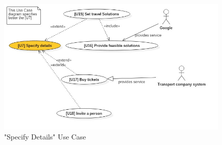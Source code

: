 	\begin{figure}[H]	
	\centerline{\includegraphics[width=\paperwidth~]{Images/UseCaseDiagram2}}
	\caption{ "Specify Details" Use Case }
\end{figure}
		\renewcommand{\arraystretch}{1.6} %
		
